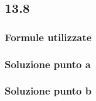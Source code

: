 \documentclass[../../main.tex]{subfiles}
\begin{document}
\subsection*{13.8}
\subsubsection*{Formule utilizzate}
\subsubsection*{Soluzione punto a}
\subsubsection*{Soluzione punto b}
\newpage
\end{document}
